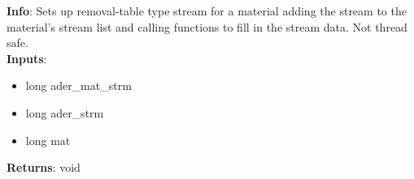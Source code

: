 \textbf{Info}: Sets up removal-table type stream for a material adding the
stream to the material's stream list and calling functions to fill in
the stream data. Not thread safe.\\

\noindent \textbf{Inputs}:
\begin{itemize}
\item{long ader\_mat\_strm}
\item{long ader\_strm}
\item{long mat}
\end{itemize}

\noindent \textbf{Returns}: void
